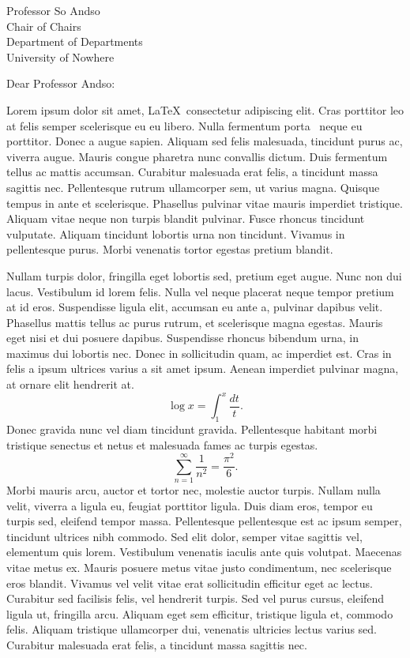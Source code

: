 \documentclass[letterpaper]{mscsletter2015}
\begin{document}
\begin{letter}{
Professor So Andso\\
Chair of Chairs\\
Department of Departments\\
University of Nowhere\\
}

\opening{Dear Professor Andso:}

Lorem ipsum dolor sit amet, \LaTeX\ consectetur adipiscing elit. Cras
porttitor leo at felis semper scelerisque eu eu libero. Nulla
fermentum porta \XeLaTeX\ neque eu porttitor. Donec a augue sapien. Aliquam sed
felis malesuada, tincidunt purus ac, viverra augue. Mauris congue
pharetra nunc convallis dictum. Duis fermentum tellus ac mattis
accumsan. Curabitur malesuada erat felis, a tincidunt massa sagittis
nec. Pellentesque rutrum ullamcorper sem, ut varius magna. Quisque
tempus in ante et scelerisque. Phasellus pulvinar vitae mauris
imperdiet tristique. Aliquam vitae neque non turpis blandit
pulvinar. Fusce rhoncus tincidunt vulputate. Aliquam tincidunt
lobortis urna non tincidunt. Vivamus in pellentesque purus. Morbi
venenatis tortor egestas pretium blandit.

Nullam turpis dolor, fringilla eget lobortis sed, pretium eget
augue. Nunc non dui lacus. Vestibulum id lorem felis. Nulla vel neque
placerat neque tempor pretium at id eros. Suspendisse ligula elit,
accumsan eu ante a, pulvinar dapibus velit. Phasellus mattis tellus ac
purus rutrum, et scelerisque magna egestas. Mauris eget nisi et dui
posuere dapibus. Suspendisse rhoncus bibendum urna, in maximus dui
lobortis nec. Donec in sollicitudin quam, ac imperdiet est. Cras in
felis a ipsum ultrices varius a sit amet ipsum. Aenean imperdiet
pulvinar magna, at ornare elit hendrerit at.
$$\log x = \int_1^x\frac{dt}{t}.$$
Donec gravida nunc vel diam tincidunt gravida. Pellentesque habitant
morbi tristique senectus et netus et malesuada fames ac turpis
egestas.
$$\sum_{n=1}^\infty\frac{1}{n^2} = \frac{\pi^2}{6}.$$
Morbi mauris arcu, auctor et tortor nec, molestie auctor
turpis. Nullam nulla velit, viverra a ligula eu, feugiat porttitor
ligula. Duis diam eros, tempor eu turpis sed, eleifend tempor
massa. Pellentesque pellentesque est ac ipsum semper, tincidunt
ultrices nibh commodo. Sed elit dolor, semper vitae sagittis vel,
elementum quis lorem. Vestibulum venenatis iaculis ante quis
volutpat. Maecenas vitae metus ex. Mauris posuere metus vitae justo
condimentum, nec scelerisque eros blandit. Vivamus vel velit vitae
erat sollicitudin efficitur eget ac lectus. Curabitur sed facilisis
felis, vel hendrerit turpis. Sed vel purus cursus, eleifend ligula ut,
fringilla arcu. Aliquam eget sem efficitur, tristique ligula et,
commodo felis. Aliquam tristique ullamcorper dui, venenatis ultricies
lectus varius sed. Curabitur malesuada erat felis, a tincidunt massa sagittis
nec.


\end{letter}
\end{document}
